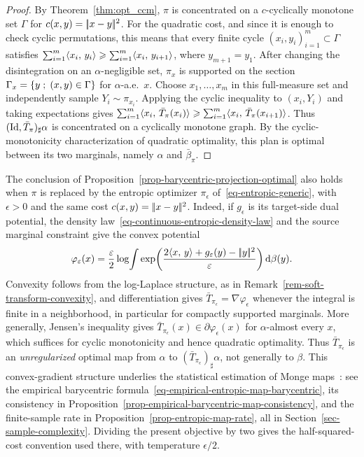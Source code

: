 \begin{proof}
	By Theorem~\ref{thm:opt_ccm}, $\pi$ is concentrated on a $c$-cyclically monotone set $\Gamma$ for $c(x,y)=|\!| x-y |\!|^2$. For the quadratic cost, and since it is enough to check cyclic permutations, this means that every finite cycle $(x_i,y_i)_{i=1}^m\subset\Gamma$ satisfies
	$\sum_{i=1}^m \langle x_i,\,y_i\rangle \geqslant \sum_{i=1}^m \langle x_i,\,y_{i+1}\rangle$, where $y_{m+1}=y_1$.
	After changing the disintegration on an $\alpha$-negligible set, $\pi_x$ is supported on the section
	\(\Gamma_x=\left\{ y \;;\; (x,y)\in\Gamma \right\}\)
	for $\alpha$-a.e.\ $x$.
	Choose $x_1,\ldots,x_m$ in this full-measure set and independently sample $Y_i\sim\pi_{x_i}$. Applying the cyclic inequality to $(x_i,Y_i)$ and taking expectations gives
	$\sum_{i=1}^m \langle x_i,\,\bar T_\pi(x_i)\rangle \geqslant \sum_{i=1}^m \langle x_i,\,\bar T_\pi(x_{i+1})\rangle$.
	Thus $(\mathrm{Id},\bar T_\pi)_\sharp\alpha$ is concentrated on a cyclically monotone graph. By the cyclic-monotonicity characterization of quadratic optimality, this plan is optimal between its two marginals, namely $\alpha$ and $\bar\beta_\pi$.
\end{proof}

The conclusion of Proposition~\ref{prop-barycentric-projection-optimal} also holds when $\pi$ is replaced by the entropic optimizer $\pi_\epsilon$ of~\eqref{eq-entropic-generic}, with $\epsilon>0$ and the same cost $c(x,y)=|\!| x-y |\!|^2$. Indeed, if $g_\epsilon$ is its target-side dual potential, the density law~\eqref{eq-continuous-entropic-density-law} and the source marginal constraint give the convex potential
\[
    \varphi_\varepsilon(x)
    =\frac{\varepsilon}{2}\log\!\int
    \exp\!\left(\frac{2\langle x,\,y\rangle+g_\varepsilon(y)-|\!| y |\!|^2}{\varepsilon}\right)\mathrm{d}\beta(y).
\]
Convexity follows from the log-Laplace structure, as in Remark~\ref{rem-soft-transform-convexity}, and differentiation gives $\bar T_{\pi_\epsilon}=\nabla\varphi_\epsilon$ whenever the integral is finite in a neighborhood, in particular for compactly supported marginals. More generally, Jensen's inequality gives $\bar T_{\pi_\epsilon}(x)\in\partial\varphi_\epsilon(x)$ for $\alpha$-almost every $x$, which suffices for cyclic monotonicity and hence quadratic optimality. Thus $\bar T_{\pi_\epsilon}$ is an \emph{unregularized} optimal map from $\alpha$ to $(\bar T_{\pi_\epsilon})_\sharp\alpha$, not generally to $\beta$. This convex-gradient structure underlies the statistical estimation of Monge maps~\cite{pooladian2021entropicOTMaps}: see the empirical barycentric formula~\eqref{eq-empirical-entropic-map-barycentric}, its consistency in Proposition~\ref{prop-empirical-barycentric-map-consistency}, and the finite-sample rate in Proposition~\ref{prop-entropic-map-rate}, all in Section~\ref{sec-sample-complexity}. Dividing the present objective by two gives the half-squared-cost convention used there, with temperature $\epsilon/2$.

